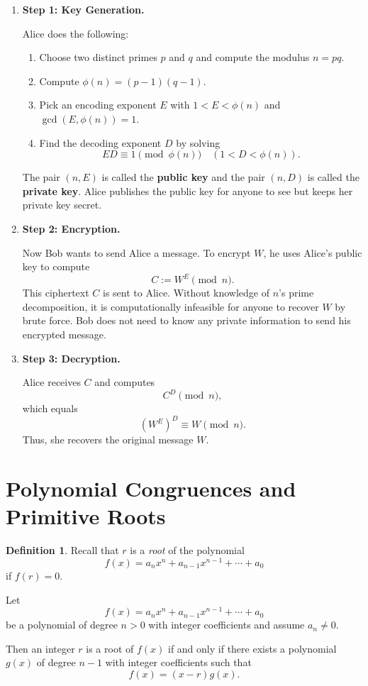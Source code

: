 \documentclass{article}
\theoremstyle{definition}
\newtheorem{definition}{Definition}
\newenvironment{manualtheorem}[1]{%
  \renewcommand{\thetheorem}{#1}%
  \theorem%
}{%
  \endtheorem%
}
\begin{document}
\begin{enumerate}
	\item \textbf{Step 1: Key Generation.}

	      Alice does the following:
	      \begin{enumerate}
		      \item Choose two distinct primes $p$ and $q$ and compute the modulus $n = pq$.
		      \item Compute $\phi(n) = (p - 1)(q - 1)$.
		      \item Pick an encoding exponent $E$ with $1 < E < \phi(n)$ and $\gcd(E, \phi(n)) = 1$.
		      \item Find the decoding exponent $D$ by solving
		            \[
			            ED \equiv 1 \pmod{\phi(n)} \quad (1 < D < \phi(n)).
		            \]
	      \end{enumerate}

	      The pair $(n, E)$ is called the \textbf{public key} and the pair $(n, D)$ is called the \textbf{private key}.
	      Alice publishes the public key for anyone to see but keeps her private key secret.

	\item \textbf{Step 2: Encryption.}

	      Now Bob wants to send Alice a message.
	      To encrypt $W$, he uses Alice’s public key to compute
	      \[
		      C := W^{E} \pmod{n}.
	      \]
	      This ciphertext $C$ is sent to Alice.
	      Without knowledge of $n$'s prime decomposition, it is computationally infeasible for anyone to recover $W$ by brute force.
	      Bob does not need to know any private information to send his encrypted message.

	\item \textbf{Step 3: Decryption.}

	      Alice receives $C$ and computes
	      \[
		      C^{D} \pmod{n},
	      \]
	      which equals
	      \[
		      (W^{E})^{D} \equiv W \pmod{n}.
	      \]
	      Thus, she recovers the original message $W$.
\end{enumerate}

\section{Polynomial Congruences and Primitive Roots}

\begin{definition}
	Recall that $r$ is a \emph{root} of the polynomial
	\[
		f(x) = a_n x^n + a_{n-1} x^{n-1} + \cdots + a_0
	\]
	if $f(r) = 0$.
\end{definition}

\begin{manualtheorem}{6.1}
	Let
	\[
		f(x) = a_n x^n + a_{n-1} x^{n-1} + \cdots + a_0
	\]
	be a polynomial of degree $n > 0$ with integer coefficients and assume $a_n \neq 0$.

	Then an integer $r$ is a root of $f(x)$ if and only if there exists a polynomial $g(x)$ of degree $n - 1$ with integer coefficients such that
	\[
		f(x) = (x - r)g(x).
	\]
\end{manualtheorem}
\end{document}
